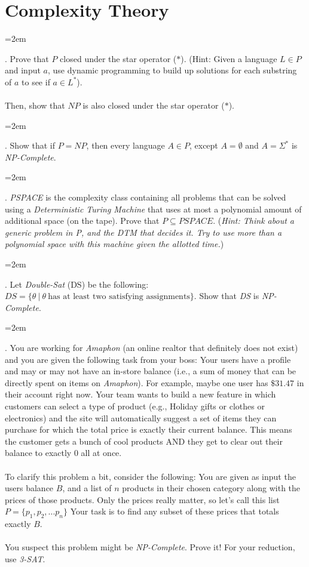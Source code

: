 \documentclass[12pt]{article}
\def\homework{Complexity Theory}
\newcounter{quesnum}
\newcommand{\question}[2][??]{
\begin{list}{\labelitemi}{\leftmargin=2em}
\item [\arabic{quesnum}.] {} {#2}
\end{list}
\addtocounter{quesnum}{1}
}
\begin{document}
\section*{\homework}


\question[3]{
Prove that $P$ closed under the star operator ($*$). (Hint: Given a language $L \in P$ and input $a$, use dynamic programming to build up solutions for each substring of $a$ to see if $a \in L^*$).\\
\\
Then, show that $NP$ is also closed under the star operator ($*$).
}

\vspace{12pt}

\question[3]{
Show that if $P = NP$, then every language $A \in P$, except $A = \emptyset$ and $A = \Sigma^*$ is \emph{NP-Complete}.
}

\vspace{12pt}



\question[3]{
\emph{PSPACE} is the complexity class containing all problems that can be solved using a \emph{Deterministic Turing Machine} that uses at most a polynomial amount of additional space (on the tape). Prove that $P \subseteq \textit{PSPACE}$. (\emph{Hint: Think about a generic problem in P, and the DTM that decides it. Try to use more than a polynomial space with this machine given the allotted time.})
}


\vspace{12pt}

\question[3]{
Let \emph{Double-Sat} (DS) be the following: $DS = \{\theta \ | \ \theta \ \text{has at least two satisfying assignments} \}$. Show that \emph{DS} is \emph{NP-Complete}.
}

\vspace{12pt}

\question[3]{
You are working for \emph{Amaphon} (an online realtor that definitely does not exist) and you are given the following task from your boss: Your users have a profile and may or may not have an in-store balance (i.e., a sum of money that can be directly spent on items on \emph{Amaphon}). For example, maybe one user has $\$31.47$ in their account right now. Your team wants to build a new feature in which customers can select a type of product (e.g., Holiday gifts or clothes or electronics) and the site will automatically suggest a set of items they can purchase for which the total price is exactly their current balance. This means the customer gets a bunch of cool products AND they get to clear out their balance to exactly 0 all at once.\\
\\
To clarify this problem a bit, consider the following: You are given as input the users balance $B$, and a list of $n$ products in their chosen category along with the prices of those products. Only the prices really matter, so let's call this list $P=\{p_1,p_2,...p_n\}$ Your task is to find any subset of these prices that totals exactly $B$.\\
\\
You suspect this problem might be \emph{NP-Complete}. Prove it! For your reduction, use \emph{3-SAT}.
}
\end{document}

